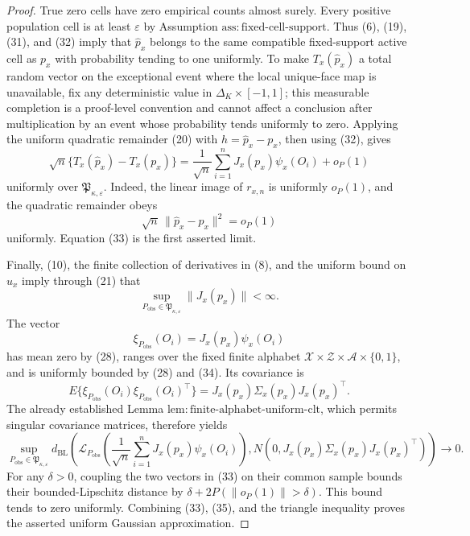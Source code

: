 \documentclass{article}
\begin{document}
\begin{proof}
True zero cells have zero empirical counts almost surely.  Every positive population cell is at least \(\varepsilon\) by Assumption \(\mathrm{ass{:}fixed\mbox{-}cell\mbox{-}support}\).  Thus (6), (19), (31), and (32) imply that \(\widehat p_x\) belongs to the same compatible fixed-support active cell as \(p_x\) with probability tending to one uniformly.  To make \(T_x(\widehat p_x)\) a total random vector on the exceptional event where the local unique-face map is unavailable, fix any deterministic value in \(\Delta_K\times[-1,1]\); this measurable completion is a proof-level convention and cannot affect a conclusion after multiplication by an event whose probability tends uniformly to zero.  Applying the uniform quadratic remainder (20) with \(h=\widehat p_x-p_x\), then using (32), gives
\[
 \sqrt n\{T_x(\widehat p_x)-T_x(p_x)\}
 =\frac1{\sqrt n}\sum_{i=1}^nJ_x(p_x)\psi_x(O_i)+o_P(1)
 \tag{33}
\]
uniformly over \(\mathfrak P_{\kappa,\varepsilon}\).  Indeed, the linear image of \(r_{x,n}\) is uniformly \(o_P(1)\), and the quadratic remainder obeys
\[
 \sqrt n\,\|\widehat p_x-p_x\|^2=o_P(1)
\]
uniformly.  Equation (33) is the first asserted limit.

Finally, (10), the finite collection of derivatives in (8), and the uniform bound on \(u_x\) imply through (21) that
\[
 \sup_{P_{\mathrm{obs}}\in\mathfrak P_{\kappa,\varepsilon}}
 \|J_x(p_x)\|<\infty.
 \tag{34}
\]
The vector
\[
 \xi_{P_{\mathrm{obs}}}(O_i)=J_x(p_x)\psi_x(O_i)
\]
has mean zero by (28), ranges over the fixed finite alphabet \(\mathcal X\times\mathcal Z\times\mathcal A\times\{0,1\}\), and is uniformly bounded by (28) and (34).  Its covariance is
\[
 E\{\xi_{P_{\mathrm{obs}}}(O_i)\xi_{P_{\mathrm{obs}}}(O_i)^\top\}
 =J_x(p_x)\Sigma_x(p_x)J_x(p_x)^\top.
\]
The already established Lemma \(\mathrm{lem{:}finite\mbox{-}alphabet\mbox{-}uniform\mbox{-}clt}\), which permits singular covariance matrices, therefore yields
\[
 \sup_{P_{\mathrm{obs}}\in\mathfrak P_{\kappa,\varepsilon}}
 d_{\mathrm{BL}}\!\left(
 \mathcal L_{P_{\mathrm{obs}}}\!\left(
  \frac1{\sqrt n}\sum_{i=1}^nJ_x(p_x)\psi_x(O_i)\right),
 N\!\left(0,J_x(p_x)\Sigma_x(p_x)J_x(p_x)^\top\right)
 \right)\longrightarrow0.
 \tag{35}
\]
For any \(\delta>0\), coupling the two vectors in (33) on their common sample bounds their bounded-Lipschitz distance by \(\delta+2P(\|o_P(1)\|>\delta)\).  This bound tends to zero uniformly.  Combining (33), (35), and the triangle inequality proves the asserted uniform Gaussian approximation.
\end{proof}
\end{document}
